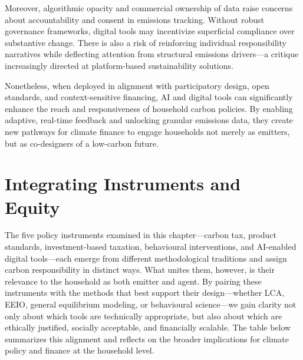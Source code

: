 \documentclass[12pt,a4paper]{article}%
\begin{document}
Moreover, algorithmic opacity and commercial ownership of data raise concerns about accountability and consent in emissions tracking. Without robust governance frameworks, digital tools may incentivize superficial compliance over substantive change. There is also a risk of reinforcing individual responsibility narratives while deflecting attention from structural emissions drivers—a critique increasingly directed at platform-based sustainability solutions.

Nonetheless, when deployed in alignment with participatory design, open standards, and context-sensitive financing, AI and digital tools can significantly enhance the reach and responsiveness of household carbon policies. By enabling adaptive, real-time feedback and unlocking granular emissions data, they create new pathways for climate finance to engage households not merely as emitters, but as co-designers of a low-carbon future.

\section{Integrating Instruments and Equity}

The five policy instruments examined in this chapter—carbon tax, product standards, investment-based taxation, behavioural interventions, and AI-enabled digital tools—each emerge from different methodological traditions and assign carbon responsibility in distinct ways. What unites them, however, is their relevance to the household as both emitter and agent. By pairing these instruments with the methods that best support their design—whether LCA, EEIO, general equilibrium modeling, or behavioural science—we gain clarity not only about which tools are technically appropriate, but also about which are ethically justified, socially acceptable, and financially scalable. The table below summarizes this alignment and reflects on the broader implications for climate policy and finance at the household level.
\end{document}
